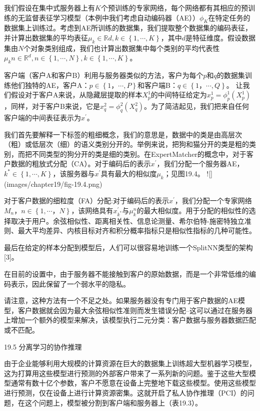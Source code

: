 我们假设在集中式服务器上有$K$个预训练的专家网络，每个网络都有其相应的预训练的无监督表征学习模型（本例中我们考虑自动编码器（AE））$\phi_{K}$在特定任务的数据集上训练过。考虑到AE所训练的数据集，我们提取整个数据集的编码表征，并计算出数据集的平均表征$\mu_{k} \in \mathbb{R}{d}, k \in \left\{ 1, \cdots, K \right\}$，其中$d$是特征维度。假设数据集由$N$个对象类别组成，我们也计算出数据集中每个类别的平均代表性$\mu_{k}{n} \in \mathbb{R}^{d}, n \in \left\{ 1, \cdots, N \right\}, k \in \left\{ 1, \cdots, K \right\}$。

客户端（客户A和客户B）利用与服务器类似的方法，客户为每个$p$和$q$的数据集训练他们独特的AE，客户A：$p \in \left\{ 1，\cdots, P \right\}$和客户端B：$q \in \left\{ 1，\cdots, Q \right\}$。 让我们假设对于客户A来说，从隐藏层提取的样本$X^1_p$的中间特征给定为$x^1_p = \phi^1_p(X^1_p)$，同样，对于客户B来说，它是$x^2_q = \phi^2_q(X^2_q)$。为了简洁起见，我们把来自任何客户端的中间表征表示为$x^{'}$。

我们首先要解释一下标签的粗细概念，我们的意思是，数据中的类是由高层次（粗）或低层次（细）的语义类别分开的。举例来说，把狗和猫分开的类是粗的类别，而把不同类型的狗分开的类是细的类别。在ExpertMatcher的概念中，对于客户数据的粗放式分配（CA）。对于编码后的表示$x^{'}$，我们分配一个服务器AE，$k^{*} \in \left\{ 1, \cdots, K \right\}$，该服务器与$x^{'}$具有最大的相似度$\mu_{k}$；见图19.4。
![](images/chapter19/fig-19.4.png)

对于客户数据的细粒度（FA）分配:对于编码后的表示$x^{'}$，我们分配一个专家网络$M_{n}，n \in \left\{ 1, \cdots，N \right\}$，该网络具有$x^{'}_{k^{*}}$与$\mu^{n}_{k}$的最大相似度。用于分配的相似性的选择取决于用户。余弦相似性、距离相关性、信息论测量、希尔伯特-施密特独立准则、最大平均差异、内核目标对齐和积分概率指标只是相似性指标的几种可能性。

最后在给定的样本分配到模型后，人们可以很容易地训练一个SplitNN类型的架构[3]。

在目前的设置中，由于服务器不能接触到客户的原始数据，而是一个非常低维的编码表示，因此保留了一个弱水平的隐私。

请注意，这种方法有一个不足之处。如果服务器没有专门用于客户数据的AE模型，客户数据就会因为最大余弦相似性准则而发生错误分配--这可以通过在服务器上增加一个额外的模型来解决，该模型执行二元分类：客户数据与服务器数据匹配或不匹配。

19.5 分离学习的协作推理

由于企业能够利用大规模的计算资源在巨大的数据集上训练超大型机器学习模型，这为打算用这些模型进行预测的外部客户带来了一系列新的问题。鉴于这些大型模型通常有数十亿个参数，客户不愿意在设备上完整地下载这些模型。使用这些模型进行预测，仅在设备上进行计算资源密集。这就开启了私人协作推理（PCI）的问题，在这个问题上，模型被分割到客户端和服务器上（表19.3）。

